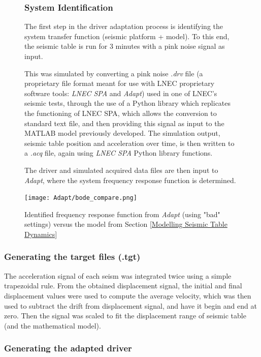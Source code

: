 \documentclass[9pt]{extarticle}
\begin{document}
\begin{figure}[H]
\begin{minipage}{0.55\textwidth}
\subsubsection{System Identification}
The first step in the driver adaptation process is identifying the system transfer function (seismic platform + model). To this end, the seismic table is run for 3 minutes with a pink noise signal as input. 

This was simulated by converting a pink noise \emph{.drv} file (a proprietary file format meant for use with LNEC proprietary software tools: \emph{LNEC SPA} and \emph{Adapt}) used in one of LNEC's seismic tests, through the use of a Python library which replicates the functioning of LNEC SPA, which allows the conversion to standard text file, and then providing this signal as input to the MATLAB model previously developed. The simulation output, seismic table position and acceleration over time, is then written to a \emph{.acq} file, again using \emph{LNEC SPA} Python library functions.

The driver and simulated acquired data files are then input to \emph{Adapt}, where the system frequency response function is determined.
\end{minipage}
\hfill
\begin{minipage}{0.4\textwidth}
     \centering
    \texttt{[image: Adapt/bode\_compare.png]}
    \caption{Identified frequency response function from \emph{Adapt} (using "bad" settings) versus the model from Section \ref{Modelling Seismic Table Dynamics}}
    \label{bode_compare}
\end{minipage}
\end{figure}

\subsubsection{Generating the target files (.tgt)}
The acceleration signal of each seism was integrated twice using a simple trapezoidal rule. From the obtained displacement signal, the initial and final displacement values were used to compute the average velocity, which was then used to subtract the drift from displacement signal, and have it begin and end at zero. Then the signal was scaled to fit the displacement range of seismic table (and the mathematical model).

\subsubsection{Generating the adapted driver}
\end{document}
